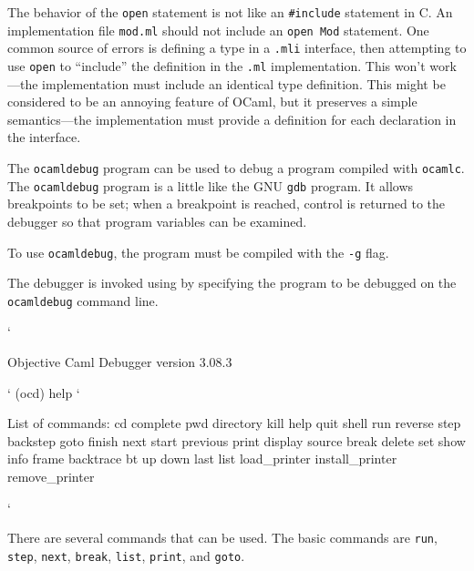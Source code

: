 The behavior of the \texttt{open} statement is not like
an \hbox{\lstinline/#include/} statement in C. An implementation
file \hbox{\lstinline/mod.ml/} should not include
an \hbox{\lstinline/open Mod/} statement. One common source of errors
is defining a type in a \hbox{\lstinline/.mli/} interface, then
attempting to use \hbox{\lstinline/open/} to ``include'' the
definition in the \hbox{\lstinline/.ml/} implementation. This won't
work---the implementation must include an identical type
definition. This might be considered to be an annoying feature of
OCaml, but it preserves a simple semantics---the implementation must
provide a definition for each declaration in the interface.


The \hbox{\lstinline/ocamldebug/} program can be used to debug a
program compiled
with \hbox{\lstinline/ocamlc/}. The \hbox{\lstinline/ocamldebug/}
program is a little like the GNU \hbox{\lstinline/gdb/} program.  It
allows breakpoints to be set; when a breakpoint is reached, control is
returned to the debugger so that program variables can be examined.

To use \hbox{\lstinline/ocamldebug/}, the program must be compiled with the
\hbox{\lstinline/-g/} flag.

\begin{ocaml}
\end{ocaml}
%
The debugger is invoked using by specifying the program to be debugged
on the \hbox{\lstinline/ocamldebug/} command line.

\begin{ocamldebug}
`
\begin{topoutput}
	Objective Caml Debugger version 3.08.3
\end{topoutput}
`
(ocd) help
`
\begin{toperror}
List of commands: cd complete pwd directory kill help quit shell run reverse
step backstep goto finish next start previous print display source break
delete set show info frame backtrace bt up down last list load_printer
install_printer remove_printer
\end{toperror}
`
\end{ocamldebug}
%
There are several commands that can be used. The basic commands
are \hbox{\lstinline/run/}, \hbox{\lstinline/step/}, \hbox{\lstinline/next/}, \hbox{\lstinline/break/}, \hbox{\lstinline/list/}, \hbox{\lstinline/print/},
and \hbox{\lstinline/goto/}.

